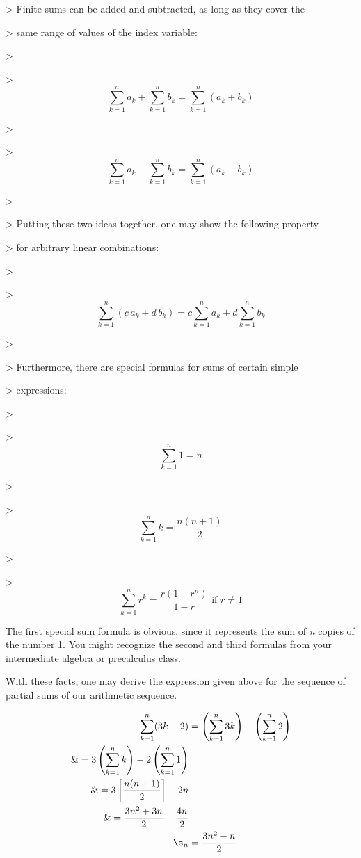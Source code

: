 > Finite sums can be added and subtracted, as long as they cover the

> same range of values of the index variable:

>

> $$\sum _{k=1}^{n} a _k+\sum _{k=1}^{n}b _k=\sum _{k=1}^{n}(a _k+b _k)$$

>

> $$\sum _{k=1}^{n} a _k-\sum _{k=1}^{n}b _k=\sum _{k=1}^{n}(a _k-b _k)$$

>

> Putting these two ideas together, one may show the following property

> for arbitrary linear combinations:

>

> $$\sum _{k=1}^{n} (c\,a _k+d\,b _k)=c\sum _{k=1}^{n}a _k+d\sum _{k=1}^{n}b _k$$

>

> Furthermore, there are special formulas for sums of certain simple

> expressions:

>

> $$\sum _{k=1}^{n} 1=n$$

>

> $$\sum _{k=1}^{n} k=\frac{n(n+1)}{2}$$

>

> $$\sum _{k=1}^{n} r^k=\frac{r(1-r^n)}{1-r}\text{ if }r\ne1$$



The first special sum formula is obvious, since it represents the sum of \textit{n} copies of the number 1. You might recognize the second and third formulas from your intermediate algebra or precalculus class.



With these facts, one may derive the expression given above for the sequence of partial sums of our arithmetic sequence.



\begin{align}
\sum _{k=1}^{n} (3k-2) 

&= \left(\sum _{k=1}^{n} 3k\right) - \left(\sum _{k=1}^{n} 2\right) \\\&= 3\left(\sum _{k=1}^{n} k\right) - 2\left(\sum _{k=1}^{n} 1\right) \\\&= 3\left[\frac{n(n+1)}{2}\right] - 2n \\\&= \frac{3n^2 + 3n}{2} - \frac{4n}{2} \\\s _n &= \frac{3n^2 - n}{2}
\end{align}





